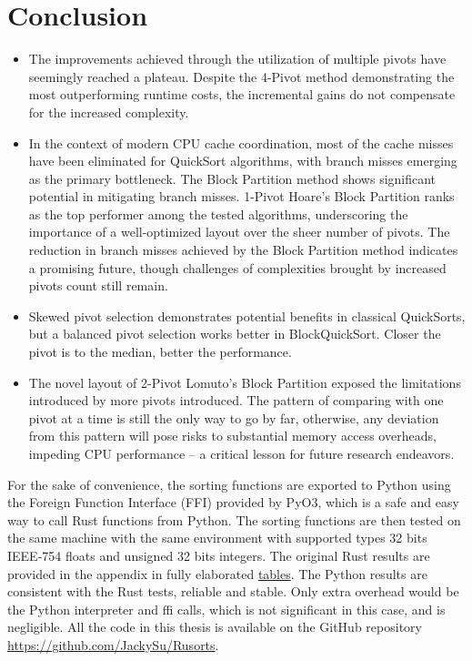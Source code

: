 \documentclass{article}
\begin{document}

\section{Conclusion}
\begin{itemize}
\item The improvements achieved through the utilization of multiple pivots have seemingly reached a plateau. Despite the 4-Pivot method demonstrating the most outperforming runtime costs, the incremental gains do not compensate for the increased complexity.
\item In the context of modern CPU cache coordination, most of the cache misses have been eliminated for QuickSort algorithms, with branch misses emerging as the primary bottleneck. The Block Partition method shows significant potential in mitigating branch misses.
    1-Pivot Hoare's Block Partition ranks as the top performer among the tested algorithms, underscoring the importance of a well-optimized layout over the sheer number of pivots.
    The reduction in branch misses achieved by the Block Partition method indicates a promising future, though challenges of complexities brought by increased pivots count still remain.
\item Skewed pivot selection demonstrates potential benefits in classical QuickSorts, but a balanced pivot selection works better in BlockQuickSort. Closer the pivot is to the median, better the performance.
\item The novel layout of 2-Pivot Lomuto's Block Partition exposed the limitations introduced by more pivots introduced. The pattern of comparing with one pivot at a time is still the only way to go by far,
    otherwise, any deviation from this pattern will pose risks to substantial memory access overheads, impeding CPU performance -- a critical lesson for future research endeavors.
\end{itemize}


For the sake of convenience, the sorting functions are exported to Python using the Foreign Function Interface (FFI) provided by PyO3, which is a safe and easy way to call Rust functions from Python.
The sorting functions are then tested on the same machine with the same environment with supported types 32 bits IEEE-754 floats and unsigned 32 bits integers. The original Rust results are provided in the appendix in fully elaborated \hyperlink{FullTables}{tables}. The Python results are consistent with the Rust tests, reliable and stable.
Only extra overhead would be the Python interpreter and ffi calls, which is not significant in this case, and is negligible. All the code in this thesis is available on the GitHub repository \url{https://github.com/JackySu/Rusorts}.
\end{document}
